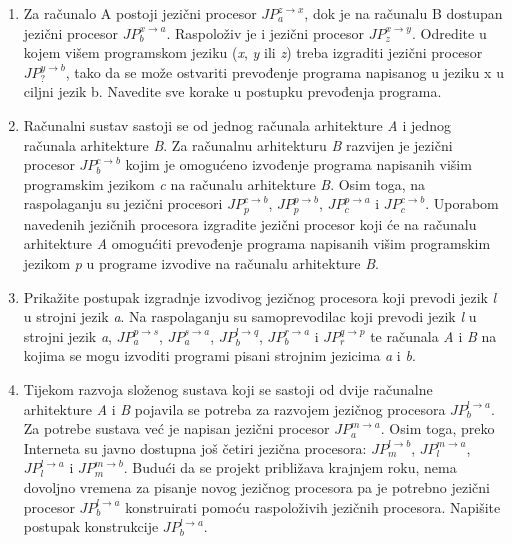\documentclass[times, 12pt, utf8]{book}
\newcommand{\JP}[3]{\(JP_{#1}^{#2 \to #3}\)}
\begin{document}
\begin{enumerate}
\item
Za računalo A postoji jezični procesor \JP{a}{z}{x}, dok je na računalu B dostupan jezični procesor \JP{b}{x}{a}. 
Raspoloživ je i jezični procesor \JP{z}{x}{y}. 
Odredite u kojem višem programskom jeziku (\textit{x}, \textit{y} ili \textit{z}) treba izgraditi jezični procesor \JP{?}{y}{b}, tako da se može ostvariti prevođenje programa napisanog u jeziku x u ciljni jezik b. 
Navedite sve korake u postupku prevođenja programa. \cite[str.~27]{udzbenik} \cite{auditorne}

\item
Računalni sustav sastoji se od jednog računala arhitekture \textit{A} i jednog računala arhitekture \textit{B}.
Za računalnu arhitekturu \textit{B} razvijen je jezični procesor \JP{b}{c}{b} kojim je omogućeno izvođenje programa napisanih višim programskim jezikom \textit{c} na računalu arhitekture \textit{B}.
Osim toga, na raspolaganju su jezični procesori \JP{p}{c}{b}, \JP{p}{p}{b}, \JP{c}{p}{a} i \JP{c}{c}{b}.
Uporabom navedenih jezičnih procesora izgradite jezični procesor koji će na računalu arhitekture \textit{A} omogućiti prevođenje programa napisanih višim programskim jezikom \textit{p} u programe izvodive na računalu arhitekture \textit{B}. \cite[str.~27]{udzbenik} \cite{auditorne}

\item
Prikažite postupak izgradnje izvodivog jezičnog procesora koji prevodi jezik \textit{l} u strojni jezik \textit{a}.
Na raspolaganju su samoprevodilac koji prevodi jezik \textit{l} u strojni jezik \textit{a}, \JP{a}{p}{s}, \JP{a}{s}{a}, \JP{b}{l}{q}, \JP{b}{r}{a} i \JP{r}{q}{p} te računala \textit{A} i \textit{B} na kojima se mogu izvoditi programi pisani strojnim jezicima \textit{a} i \textit{b}. \cite[str.~27]{udzbenik} \cite{auditorne}

\item
Tijekom razvoja složenog sustava koji se sastoji od dvije računalne arhitekture \textit{A} i \textit{B} pojavila se potreba za razvojem jezičnog procesora \JP{b}{l}{a}.
Za potrebe sustava već je napisan jezični procesor \JP{a}{m}{a}.
Osim toga, preko Interneta su javno dostupna još četiri jezična procesora: \JP{m}{l}{b}, \JP{l}{m}{a}, \JP{l}{l}{a} i \JP{m}{m}{b}.
Budući da se projekt približava krajnjem roku, nema dovoljno vremena za pisanje novog jezičnog procesora pa je potrebno jezični procesor \JP{b}{l}{a} konstruirati pomoću raspoloživih jezičnih procesora.
Napišite postupak konstrukcije \JP{b}{l}{a}. \cite[str.~27]{udzbenik} \cite{auditorne}


\end{enumerate}
\end{document}
